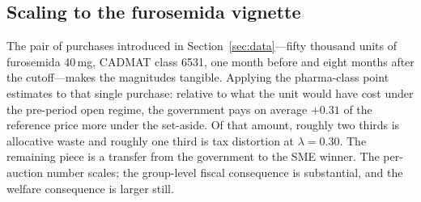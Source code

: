 \subsection{Scaling to the furosemida vignette}

The pair of purchases introduced in Section~\ref{sec:data}---fifty thousand units of furosemida 40\,mg, CADMAT class 6531, one month before and eight months after the cutoff---makes the magnitudes tangible. Applying the pharma-class point estimates to that single purchase: relative to what the unit would have cost under the pre-period open regime, the government pays on average $+0.31$ of the reference price more under the set-aside. Of that amount, roughly two thirds is allocative waste and roughly one third is tax distortion at $\lambda = 0.30$. The remaining piece is a transfer from the government to the SME winner. The per-auction number scales; the group-level fiscal consequence is substantial, and the welfare consequence is larger still.
